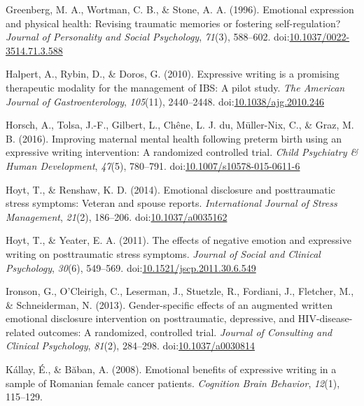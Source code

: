 \documentclass[man]{apa6}
\theoremstyle{definition}
\theoremstyle{definition}
\theoremstyle{definition}
\theoremstyle{remark}
\begin{document}
\leavevmode\hypertarget{ref-Greenberg1996}{}%
Greenberg, M. A., Wortman, C. B., \& Stone, A. A. (1996). Emotional
expression and physical health: Revising traumatic memories or fostering
self-regulation? \emph{Journal of Personality and Social Psychology},
\emph{71}(3), 588--602.
doi:\href{https://doi.org/10.1037/0022-3514.71.3.588}{10.1037/0022-3514.71.3.588}

\leavevmode\hypertarget{ref-Halpert2010}{}%
Halpert, A., Rybin, D., \& Doros, G. (2010). Expressive writing is a
promising therapeutic modality for the management of IBS: A pilot study.
\emph{The American Journal of Gastroenterology}, \emph{105}(11),
2440--2448.
doi:\href{https://doi.org/10.1038/ajg.2010.246}{10.1038/ajg.2010.246}

\leavevmode\hypertarget{ref-Horsch2016}{}%
Horsch, A., Tolsa, J.-F., Gilbert, L., Chêne, L. J. du, Müller-Nix, C.,
\& Graz, M. B. (2016). Improving maternal mental health following
preterm birth using an expressive writing intervention: A randomized
controlled trial. \emph{Child Psychiatry \& Human Development},
\emph{47}(5), 780--791.
doi:\href{https://doi.org/10.1007/s10578-015-0611-6}{10.1007/s10578-015-0611-6}

\leavevmode\hypertarget{ref-Hoyt2014}{}%
Hoyt, T., \& Renshaw, K. D. (2014). Emotional disclosure and
posttraumatic stress symptoms: Veteran and spouse reports.
\emph{International Journal of Stress Management}, \emph{21}(2),
186--206. doi:\href{https://doi.org/10.1037/a0035162}{10.1037/a0035162}

\leavevmode\hypertarget{ref-Hoyt2011}{}%
Hoyt, T., \& Yeater, E. A. (2011). The effects of negative emotion and
expressive writing on posttraumatic stress symptoms. \emph{Journal of
Social and Clinical Psychology}, \emph{30}(6), 549--569.
doi:\href{https://doi.org/10.1521/jscp.2011.30.6.549}{10.1521/jscp.2011.30.6.549}

\leavevmode\hypertarget{ref-Ironson2013}{}%
Ironson, G., O'Cleirigh, C., Leserman, J., Stuetzle, R., Fordiani, J.,
Fletcher, M., \& Schneiderman, N. (2013). Gender-specific effects of an
augmented written emotional disclosure intervention on posttraumatic,
depressive, and HIV-disease-related outcomes: A randomized, controlled
trial. \emph{Journal of Consulting and Clinical Psychology},
\emph{81}(2), 284--298.
doi:\href{https://doi.org/10.1037/a0030814}{10.1037/a0030814}

\leavevmode\hypertarget{ref-Kallay2008}{}%
Kállay, É., \& Băban, A. (2008). Emotional benefits of expressive
writing in a sample of Romanian female cancer patients. \emph{Cognition
Brain Behavior}, \emph{12}(1), 115--129.
\end{document}
